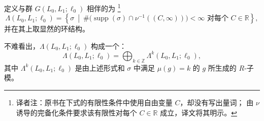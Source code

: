 \begin{definition}
\label{def:lagrangian-novikov-ring}
定义与群 $G(L_0,L_1;\ell_0)$ 相伴的\termNovikovRing{}为
\footnote{译者注：原书在下式的有限性条件中使用自由变量 $C$，却没有写出量词；
由 $\nu$ 诱导的完备化条件要求该有限性对每个 $C\in\mathbb R$ 成立，译文将其明示。}
\[
  \Lambda(L_0,L_1;\ell_0)
  =\left\{\sigma\ \middle|\
    \#\bigl(\operatorname{supp}(\sigma)
      \cap\nu^{-1}((C,\infty))\bigr)<\infty
    \text{ 对每个 }C\in\mathbb R\right\},
\]
并在其上取显然的环结构。
\end{definition}

不难看出，$\Lambda(L_0,L_1;\ell_0)$ 构成一个\termGradedRModule{}：
\[
  \Lambda(L_0,L_1;\ell_0)
  =\bigoplus_{k\in\mathbb Z}\Lambda^k(L_0,L_1;\ell_0),
\]
其中 $\Lambda^k(L_0,L_1;\ell_0)$ 是由上述形式和 $\sigma$ 中满足
$\mu(g)=k$ 的 $g$ 所生成的 $R$-子模。
